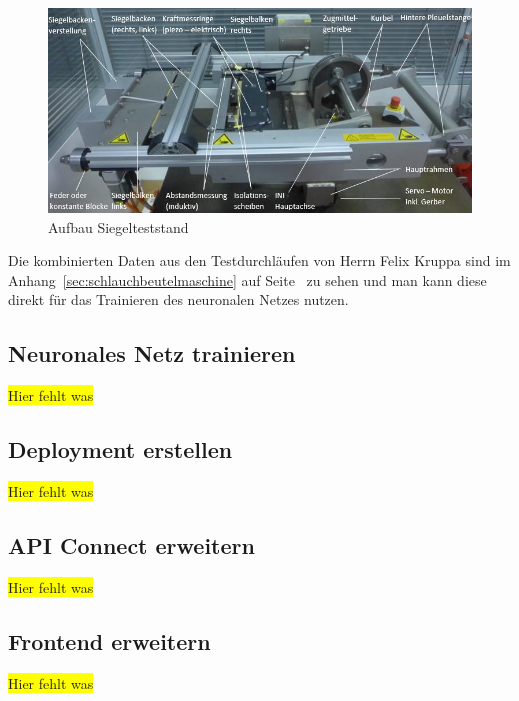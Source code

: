 \begin{figure}[h]
    \centering
    \includegraphics[width=\textwidth]{images/kapitel_5/vffs_simulator.png}
    \caption{Aufbau Siegelteststand}
    \label{fig:siegelmaschinen_vffs_simulator}
\end{figure}

Die kombinierten Daten aus den Testdurchläufen von Herrn Felix Kruppa sind im Anhang~\ref{sec:schlauchbeutelmaschine}
auf Seite~\pageref{sec:schlauchbeutelmaschine} zu sehen und man kann diese direkt für das Trainieren des neuronalen
Netzes nutzen.

\subsection{Neuronales Netz trainieren}
\colorbox{yellow}{Hier fehlt was}

\subsection{Deployment erstellen}
\colorbox{yellow}{Hier fehlt was}

\subsection{API Connect erweitern}
\colorbox{yellow}{Hier fehlt was}

\subsection{Frontend erweitern}
\colorbox{yellow}{Hier fehlt was}